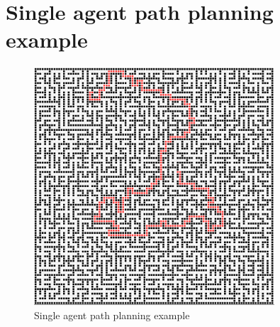 \chapter{Single agent path planning example}
\begin{figure}[H]
    \centering
    \includegraphics[width=0.8\textwidth]{docs/thesis/pictures/single_path_maze.png}
    \caption{ Single agent path planning example} 
    \label{fig:single_agent_path}
\end{figure}